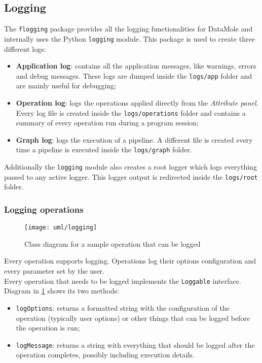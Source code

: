 \subsection{Logging}
The \texttt{flogging} package provides all the logging functionalities for DataMole and internally uses the Python \texttt{logging} module. This package is used to create three different logs:
\begin{itemize}
	\item \textbf{Application log}: contains all the application messages, like warnings, errors and debug messages. These logs are dumped inside the \texttt{logs/app} folder and are mainly useful for debugging;
	\item \textbf{Operation log}: logs the operations applied directly from the \textit{Attribute panel}. Every log file is created inside the \texttt{logs/operations} folder and contains a summary of every operation run during a program session;
	\item \textbf{Graph log}: logs the execution of a pipeline. A different file is created every time a pipeline is executed inside the \texttt{logs/graph} folder.
\end{itemize}
Additionally the \texttt{logging} module also creates a root logger which logs everything passed to any active logger. This logger output is redirected inside the \texttt{logs/root} folder.

\subsubsection{Logging operations}\label{sssec:logging}
\begin{figure}
	\centering
	\texttt{[image: uml/logging]}
	\caption{Class diagram for a sample operation that can be logged}
	\label{fig:loguml}
\end{figure}
Every operation supports logging. Operations log their options configuration and every parameter set by the user.\\
Every operation that needs to be logged implements the \texttt{Loggable} interface. Diagram in \cref{fig:loguml} shows its two methods:
\begin{itemize}
	\item \texttt{logOptions}: returns a formatted string with the configuration of the operation (typically user options) or other things that can be logged before the operation is run;
	\item \texttt{logMessage}: returns a string with everything that should be logged after the operation completes, possibly including execution details.
\end{itemize}


